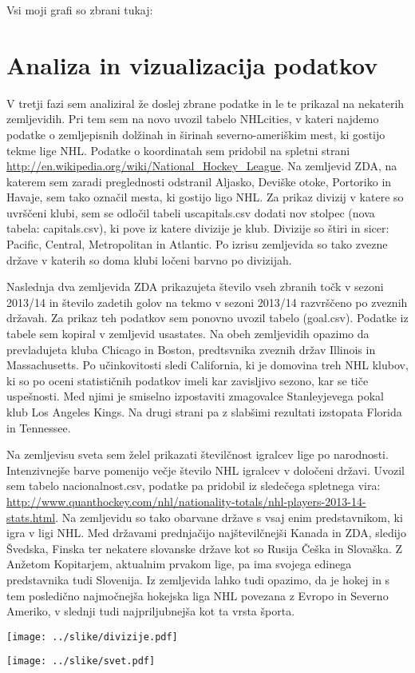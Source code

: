 \documentclass[11pt,a4paper]{article}
\begin{document}
Vsi moji grafi so zbrani tukaj:



\section{Analiza in vizualizacija podatkov}

V tretji fazi sem analiziral že doslej zbrane podatke in le te prikazal na nekaterih zemljevidih. Pri tem sem na novo uvozil tabelo NHLcities, v kateri najdemo podatke o zemljepisnih dolžinah in širinah severno-ameriškim mest, ki gostijo tekme lige NHL. Podatke o koordinatah sem pridobil na spletni strani \url{http://en.wikipedia.org/wiki/National_Hockey_League}. Na zemljevid ZDA, na katerem sem zaradi preglednosti odstranil Aljasko, Deviške otoke, Portoriko in Havaje, sem tako označil mesta, ki gostijo ligo NHL.
Za prikaz divizij v katere so uvrščeni klubi, sem se odločil tabeli uscapitals.csv dodati nov stolpec (nova tabela: capitals.csv), ki pove iz katere divizije je klub. Divizije so štiri in sicer: Pacific, Central, Metropolitan in Atlantic. Po izrisu zemljevida so tako zvezne države v katerih so doma klubi ločeni barvno po divizijah. 

Naslednja dva zemljevida ZDA prikazujeta število vseh zbranih točk v sezoni 2013/14 in število zadetih golov na tekmo v sezoni 2013/14 razvrščeno po zveznih državah. Za prikaz teh podatkov sem ponovno uvozil tabelo (goal.csv). Podatke iz tabele sem kopiral v zemljevid usastates. Na obeh zemljevidih opazimo da prevladujeta kluba Chicago in Boston, predtsvnika zveznih držav Illinois in Massachusetts. Po učinkovitosti sledi California, ki je domovina treh NHL klubov, ki so po oceni statističnih podatkov imeli kar zavisljivo sezono, kar se tiče uspešnosti. Med njimi je smiselno izpostaviti zmagovalce Stanleyjevega pokal klub Los Angeles Kings. Na drugi strani pa z slabšimi rezultati izstopata Florida in Tennessee.

Na zemljevisu sveta sem želel prikazati številčnost igralcev lige po narodnosti. Intenzivnejše barve pomenijo večje število NHL igralcev v določeni državi. Uvozil sem tabelo nacionalnost.csv, podatke pa pridobil iz sledečega spletnega vira: \url{http://www.quanthockey.com/nhl/nationality-totals/nhl-players-2013-14-stats.html}. Na zemljevidu so tako obarvane države s vsaj enim predstavnikom, ki igra v ligi NHL. Med državami prednjačijo najštevilčnejši Kanada in ZDA, sledijo Švedska, Finska ter nekatere slovanske države kot so Rusija Češka in Slovaška. Z Anžetom Kopitarjem, aktualnim prvakom lige, pa ima svojega edinega predstavnika tudi Slovenija. Iz zemljevida lahko tudi opazimo, da je hokej in s tem posledično najmočnejša hokejska liga NHL povezana z Evropo in Severno Ameriko, v slednji tudi najpriljubnejša kot ta vrsta športa.


\texttt{[image: ../slike/divizije.pdf]}



\texttt{[image: ../slike/svet.pdf]}
\end{document}
